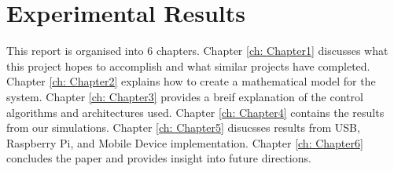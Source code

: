 \section{Experimental Results}
This report is organised into 6 chapters.  Chapter \ref{ch: Chapter1} discusses what this project hopes to accomplish and what similar projects have completed.  Chapter \ref{ch: Chapter2} explains how to create a mathematical model for the system.  Chapter \ref{ch: Chapter3} provides a breif explanation of the control algorithms and architectures used.  Chapter \ref{ch: Chapter4} contains the results from our simulations.  Chapter \ref{ch: Chapter5} disucsses results from USB, Raspberry Pi, and Mobile Device implementation.  Chapter \ref{ch: Chapter6} concludes the paper and provides insight into future directions.

